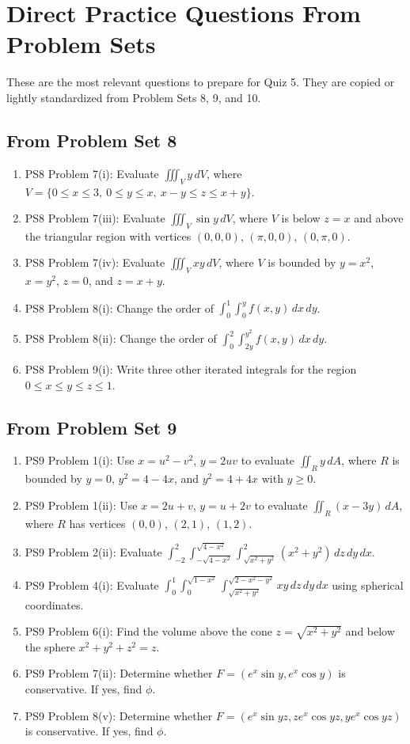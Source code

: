 \documentclass[11pt]{article}
\begin{document}
\section{Direct Practice Questions From Problem Sets}

These are the most relevant questions to prepare for Quiz 5. They are copied or lightly standardized from Problem Sets 8, 9, and 10.

\subsection*{From Problem Set 8}
\begin{enumerate}
\item PS8 Problem 7(i): Evaluate $\iiint_V y\,dV$, where $V=\{0\le x\le 3,\ 0\le y\le x,\ x-y\le z\le x+y\}$.
\item PS8 Problem 7(iii): Evaluate $\iiint_V \sin y\,dV$, where $V$ is below $z=x$ and above the triangular region with vertices $(0,0,0)$, $(\pi,0,0)$, $(0,\pi,0)$.
\item PS8 Problem 7(iv): Evaluate $\iiint_V xy\,dV$, where $V$ is bounded by $y=x^2$, $x=y^2$, $z=0$, and $z=x+y$.
\item PS8 Problem 8(i): Change the order of $\int_0^1\int_0^y f(x,y)\,dx\,dy$.
\item PS8 Problem 8(ii): Change the order of $\int_0^2\int_{2y}^{y^2}f(x,y)\,dx\,dy$.
\item PS8 Problem 9(i): Write three other iterated integrals for the region $0\le x\le y\le z\le 1$.
\end{enumerate}

\subsection*{From Problem Set 9}
\begin{enumerate}
\item PS9 Problem 1(i): Use $x=u^2-v^2$, $y=2uv$ to evaluate $\iint_R y\,dA$, where $R$ is bounded by $y=0$, $y^2=4-4x$, and $y^2=4+4x$ with $y\ge0$.
\item PS9 Problem 1(ii): Use $x=2u+v$, $y=u+2v$ to evaluate $\iint_R(x-3y)\,dA$, where $R$ has vertices $(0,0)$, $(2,1)$, $(1,2)$.
\item PS9 Problem 2(ii): Evaluate $\int_{-2}^2\int_{-\sqrt{4-x^2}}^{\sqrt{4-x^2}}\int_{\sqrt{x^2+y^2}}^2(x^2+y^2)\,dz\,dy\,dx$.
\item PS9 Problem 4(i): Evaluate $\int_0^1\int_0^{\sqrt{1-x^2}}\int_{\sqrt{x^2+y^2}}^{\sqrt{2-x^2-y^2}}xy\,dz\,dy\,dx$ using spherical coordinates.
\item PS9 Problem 6(i): Find the volume above the cone $z=\sqrt{x^2+y^2}$ and below the sphere $x^2+y^2+z^2=z$.
\item PS9 Problem 7(ii): Determine whether $F=(e^x\sin y,e^x\cos y)$ is conservative. If yes, find $\phi$.
\item PS9 Problem 8(v): Determine whether $F=(e^x\sin yz,ze^x\cos yz,ye^x\cos yz)$ is conservative. If yes, find $\phi$.
\end{enumerate}
\end{document}

